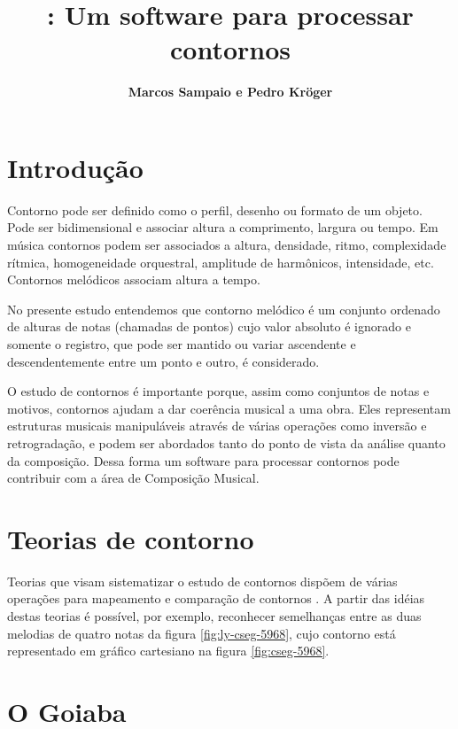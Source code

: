\documentclass{sciposter}
\title{\goiaba{}: Um software para processar contornos}
\author{\textbf{Marcos Sampaio e Pedro Kröger}}
\institute{Genos---Grupo de pesquisa em computação musical}
\begin{document}



\maketitle

\begin{multicols}{3}

\section{Introdução}

Contorno pode ser definido como o perfil, desenho ou formato de um
objeto. Pode ser bidimensional e associar altura a comprimento,
largura ou tempo. Em música contornos podem ser associados a altura,
densidade, ritmo, complexidade rítmica, homogeneidade orquestral,
amplitude de harmônicos, intensidade, etc. Contornos melódicos
associam altura a tempo.

No presente estudo entendemos que contorno melódico é um conjunto
ordenado de alturas de notas (chamadas de pontos) cujo valor absoluto
é ignorado e somente o registro, que pode ser mantido ou variar
ascendente e descendentemente entre um ponto e outro, é considerado.

O estudo de contornos é importante porque, assim como conjuntos de
notas e motivos, contornos ajudam a dar coerência musical a uma
obra. Eles representam estruturas musicais manipuláveis através de
várias operações como inversão e retrogradação, e podem ser abordados
tanto do ponto de vista da análise quanto da composição. Dessa forma
um software para processar contornos pode contribuir com a área de
Composição Musical.

\section{Teorias de contorno}

Teorias que visam sistematizar o estudo de contornos dispõem de várias
operações para mapeamento e comparação de contornos
\cite{friedmann85:methodology,friedmann87:response,morris87:composition,morris93:directions,marvin.ea87:relating,clifford95:contour,polansky.ea92:possible,quinn97:fuzzy,beard03:contour}
. A partir das idéias destas teorias é possível, por exemplo,
reconhecer semelhanças entre as duas melodias de quatro notas da
figura \ref{fig:ly-cseg-5968}, cujo contorno está representado em
gráfico cartesiano na figura \ref{fig:cseg-5968}.

\section{O Goiaba}

\end{multicols}
\end{document}
